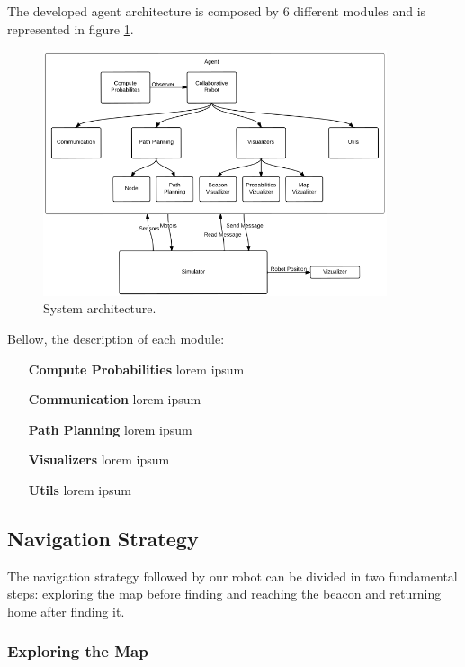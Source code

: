 \documentclass[oribibl]{llncs}
\begin{document}
The developed agent architecture is composed by 6 different modules and is represented in figure \ref{fig:robot-arch}.

\begin{figure}
  \centering
  \includegraphics[width=0.9\textwidth]{robot-architecture.png}
  \caption{System architecture.}
  \label{fig:robot-arch}
\end{figure}

Bellow, the description of each module:

\begin{itemize}
  \item[\textbf{Compute Probabilities}]
  lorem ipsum
  \item[\textbf{Communication}]
  lorem ipsum
  \item[\textbf{Path Planning}]
  lorem ipsum
  \item[\textbf{Visualizers}]
  lorem ipsum
  \item[\textbf{Utils}]
  lorem ipsum
\end{itemize}

\subsection{Navigation Strategy}
The navigation strategy followed by our robot can be divided in two fundamental steps: exploring the map before finding and reaching the beacon and returning home after finding it.

\subsubsection{Exploring the Map}\hfill \\
\end{document}
